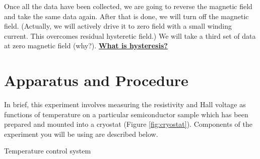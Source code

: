 \documentclass{../lab}
\newcommand{\WhatIsHysteresis}{http://experimentationlab.berkeley.edu/hysteresis}
\begin{document}
Once all the data have been collected, we are going to reverse the magnetic field and take the same data again. After that is done, we will turn off the magnetic field. (Actually, we will actively drive it to zero field with a small winding current. This overcomes residual hysteretic field.) We will take a third set of data at zero magnetic field (why?). \href{\WhatIsHysteresis}{\textbf{What is hysteresis?}}

\section{Apparatus and Procedure}

In brief, this experiment involves measuring the resistivity and Hall voltage as functions of temperature on a particular semiconductor sample which has been prepared and mounted into a cryostat (Figure \ref{fig:cryostat}). Components of the experiment you will be using are described below.

\noindent Temperature control system
\end{document}
